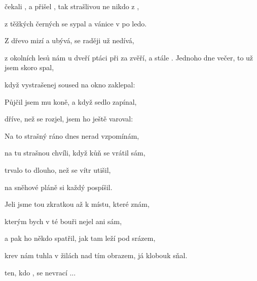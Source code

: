 
\zs
{} čekali , a  přišel ,
tak strašlivou  ne nikdo z ,

z těžkých černých  se  sypal 
a vánice  v po ledo.

Z  dřevo mizí a  ubývá,
 se raději už  nedívá,

 z okolních lesů nám  u dveří
 ptáci při za zvěří, a stále .
\ks
\zs
Jednoho dne večer, to už jsem skoro spal,

když vystrašenej soused na okno zaklepal:


Půjčil jsem mu koně, a když sedlo zapínal,

dříve, než se rozjel, jsem ho ještě varoval:

\ks
\zs
Na to strašný ráno dnes nerad vzpomínám,

na tu strašnou chvíli, když kůň se vrátil sám,

trvalo to dlouho, než se vítr utišil,

na sněhové pláně si každý pospíšil.

Jeli jsme tou zkratkou až k místu, které znám,

kterým bych v té bouři nejel ani sám,

a pak ho někdo spatřil, jak tam leží pod srázem,

krev nám tuhla v žilách nad tím obrazem, já klobouk sňal.
\ks

 ten, kdo , se  nevrací ...
\kp





